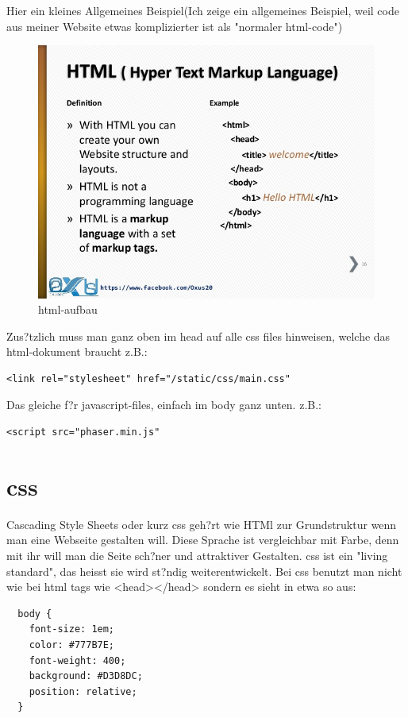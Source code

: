 \documentclass{article}
\begin{document}
Hier ein kleines Allgemeines Beispiel(Ich zeige ein allgemeines Beispiel, weil code aus meiner Website etwas komplizierter ist als "normaler html-code")

\begin{figure}[ht]
    \centering
    \includegraphics[width=.7\linewidth]{html-wissen}
    \caption{html-aufbau}
    \label{fig:sub1}
    \end{figure}
Zus?tzlich muss man ganz oben im head auf alle css files hinweisen, welche das html-dokument braucht z.B.:

\begin{lstlisting}
<link rel="stylesheet" href="/static/css/main.css"
\end{lstlisting}

Das gleiche f?r javascript-files, einfach im body ganz unten. z.B.:

\begin{lstlisting}
<script src="phaser.min.js"
\end{lstlisting}








\cleardoublepage


\section{css}
Cascading Style Sheets oder kurz css geh?rt wie HTMl zur Grundstruktur wenn man eine Webseite gestalten will.
Diese Sprache ist vergleichbar mit Farbe, denn mit ihr will man die Seite sch?ner und attraktiver Gestalten.
css ist ein "living standard", das heisst sie wird st?ndig weiterentwickelt.
Bei css benutzt man nicht wie bei html tags wie <head></head> sondern es sieht in etwa so aus:\\
\begin{lstlisting}
  body {
    font-size: 1em;
    color: #777B7E;
    font-weight: 400;
    background: #D3D8DC;
    position: relative;
  }
\end{lstlisting}
\end{document}
